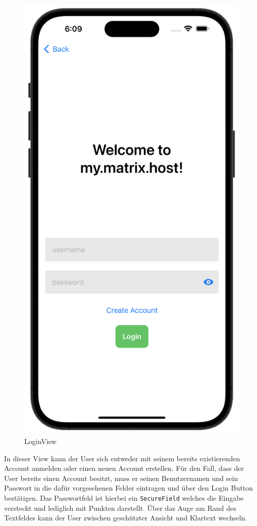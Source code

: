     \begin{figure}[h]
        \includegraphics[scale=0.5]{login_white}
        \centering
        \caption{LoginView}\label{fig:loginview}
    \end{figure}
    In dieser View kann der User sich entweder mit seinem bereits existierenden Account anmelden oder einen neuen Account erstellen.
    Für den Fall, dass der User bereits einen Account besitzt, muss er seinen Benutzernamen und sein Passwort in die dafür vorgesehenen Felder eintragen und über den Login Button bestätigen.
    Das Passwortfeld ist hierbei ein \texttt{SecureField} welches die Eingabe versteckt und lediglich mit Punkten darstellt.
    Über das Auge am Rand des Textfeldes kann der User zwischen geschützter Ansicht und Klartext wechseln.

